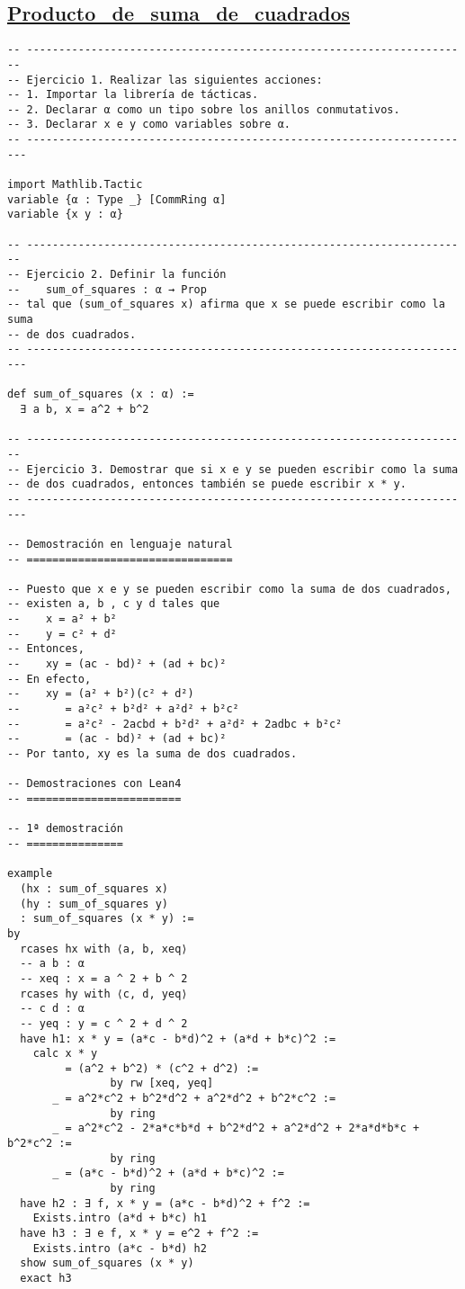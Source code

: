 \subsection{\href{./src/Logica/Producto\_de\_suma\_de\_cuadrados.lean}{Producto\_de\_suma\_de\_cuadrados}}
\label{sec:org679a942}
\begin{verbatim}
-- ---------------------------------------------------------------------
-- Ejercicio 1. Realizar las siguientes acciones:
-- 1. Importar la librería de tácticas.
-- 2. Declarar α como un tipo sobre los anillos conmutativos.
-- 3. Declarar x e y como variables sobre α.
-- ----------------------------------------------------------------------

import Mathlib.Tactic
variable {α : Type _} [CommRing α]
variable {x y : α}

-- ---------------------------------------------------------------------
-- Ejercicio 2. Definir la función
--    sum_of_squares : α → Prop
-- tal que (sum_of_squares x) afirma que x se puede escribir como la suma
-- de dos cuadrados.
-- ----------------------------------------------------------------------

def sum_of_squares (x : α) :=
  ∃ a b, x = a^2 + b^2

-- ---------------------------------------------------------------------
-- Ejercicio 3. Demostrar que si x e y se pueden escribir como la suma
-- de dos cuadrados, entonces también se puede escribir x * y.
-- ----------------------------------------------------------------------

-- Demostración en lenguaje natural
-- ================================

-- Puesto que x e y se pueden escribir como la suma de dos cuadrados,
-- existen a, b , c y d tales que
--    x = a² + b²
--    y = c² + d²
-- Entonces,
--    xy = (ac - bd)² + (ad + bc)²
-- En efecto,
--    xy = (a² + b²)(c² + d²)
--       = a²c² + b²d² + a²d² + b²c²
--       = a²c² - 2acbd + b²d² + a²d² + 2adbc + b²c²
--       = (ac - bd)² + (ad + bc)²
-- Por tanto, xy es la suma de dos cuadrados.

-- Demostraciones con Lean4
-- ========================

-- 1ª demostración
-- ===============

example
  (hx : sum_of_squares x)
  (hy : sum_of_squares y)
  : sum_of_squares (x * y) :=
by
  rcases hx with ⟨a, b, xeq⟩
  -- a b : α
  -- xeq : x = a ^ 2 + b ^ 2
  rcases hy with ⟨c, d, yeq⟩
  -- c d : α
  -- yeq : y = c ^ 2 + d ^ 2
  have h1: x * y = (a*c - b*d)^2 + (a*d + b*c)^2 :=
    calc x * y
         = (a^2 + b^2) * (c^2 + d^2) :=
                by rw [xeq, yeq]
       _ = a^2*c^2 + b^2*d^2 + a^2*d^2 + b^2*c^2 :=
                by ring
       _ = a^2*c^2 - 2*a*c*b*d + b^2*d^2 + a^2*d^2 + 2*a*d*b*c + b^2*c^2 :=
                by ring
       _ = (a*c - b*d)^2 + (a*d + b*c)^2 :=
                by ring
  have h2 : ∃ f, x * y = (a*c - b*d)^2 + f^2 :=
    Exists.intro (a*d + b*c) h1
  have h3 : ∃ e f, x * y = e^2 + f^2 :=
    Exists.intro (a*c - b*d) h2
  show sum_of_squares (x * y)
  exact h3


\end{verbatim}
